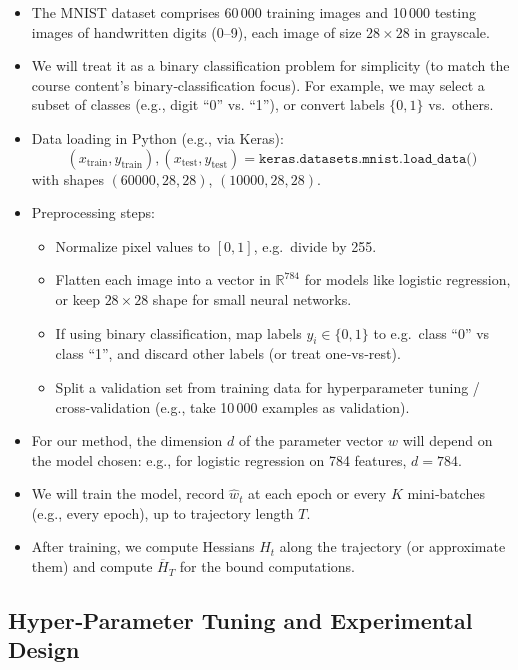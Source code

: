 \begin{itemize}[noitemsep]
  \item The MNIST dataset comprises 60\,000 training images and 10\,000 testing images of handwritten digits (0–9), each image of size \(28\times28\) in grayscale.
  \item We will treat it as a binary classification problem for simplicity (to match the course content’s binary‐classification focus). For example, we may select a subset of classes (e.g., digit “0” vs. “1”), or convert labels \(\{0,1\}\) vs.\ others.  
  \item Data loading in Python (e.g., via Keras):  
\[
(x_{\text{train}},y_{\text{train}}),(x_{\text{test}},y_{\text{test}}) = \texttt{keras.datasets.mnist.load\_data()}
\]
with shapes \((60000,28,28)\), \((10000,28,28)\). 
  \item Preprocessing steps:
    \begin{itemize}[noitemsep]
      \item Normalize pixel values to \([0,1]\), e.g.\ divide by 255.  
      \item Flatten each image into a vector in \(\mathbb R^{784}\) for models like logistic regression, or keep \(28\times28\) shape for small neural networks.  
      \item If using binary classification, map labels \(y_i\in\{0,1\}\) to e.g.\ class “0” vs class “1”, and discard other labels (or treat one‐vs‐rest).  
      \item Split a validation set from training data for hyperparameter tuning / cross‐validation (e.g., take 10\,000 examples as validation).  
    \end{itemize}
  \item For our method, the dimension \(d\) of the parameter vector \(w\) will depend on the model chosen: e.g., for logistic regression on 784 features, \(d=784\).  
  \item We will train the model, record \(\widehat w_t\) at each epoch or every \(K\) mini‐batches (e.g., every epoch), up to trajectory length \(T\).  
  \item After training, we compute Hessians \(H_t\) along the trajectory (or approximate them) and compute \(\overline H_T\) for the bound computations.
\end{itemize}

\subsection{Hyper‐Parameter Tuning and Experimental Design}

